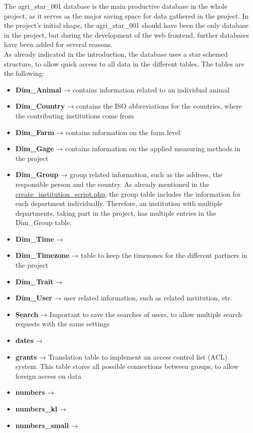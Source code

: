 The agri\_star\_001 database is the main productive database in the whole project, as it serves as the major saving space for data gathered in the project. In the project's initial 
shape, the agri\_star\_001 should have been the only database in the project, but during the development of the web frontend, further databases have been added for several 
reasons.\\
As already indicated in the introduction, the database uses a star schemed structure, to allow quick access to all data in the different tables. The tables are the following:
\begin{itemize}
 \item \textbf{Dim\_Animal} → contains information related to an individual animal
 \item \textbf{Dim\_Country} → contains the ISO abbreviations for the countries, where the contributing institutions come from
 \item \textbf{Dim\_Farm} → contains information on the farm level
 \item \textbf{Dim\_Gage} → contains information on the applied measuring methods in the project
 \item \textbf{Dim\_Group} → group related information, such as the address, the responsible person and the country. As already mentioned in the 
 \hyperref[create_institution_script.php]{create\_institution\_script.php}, the group table includes the information for each department individually. Therefore, an institution 
 with multiple departments, taking part in the project, has multiple entries in the Dim\_Group table.
 \item \textbf{Dim\_Time} →
 \item \textbf{Dim\_Timezone} → table to keep the timezones for the different partners in the project
 \item \textbf{Dim\_Trait} →
 \item \textbf{Dim\_User} → user related information, such as related institution, etc.
 \item \textbf{Search} → Important to save the searches of users, to allow multiple search requests with the same settings
 \item \textbf{dates} →
 \item \textbf{grants} → Translation table to implement an access control list (ACL) system. This table stores all possible connections between groups, to allow foreign access on 
 data
 \item \textbf{numbers} →
 \item \textbf{numbers\_kl} →
 \item \textbf{numbers\_small} →
\end{itemize}

